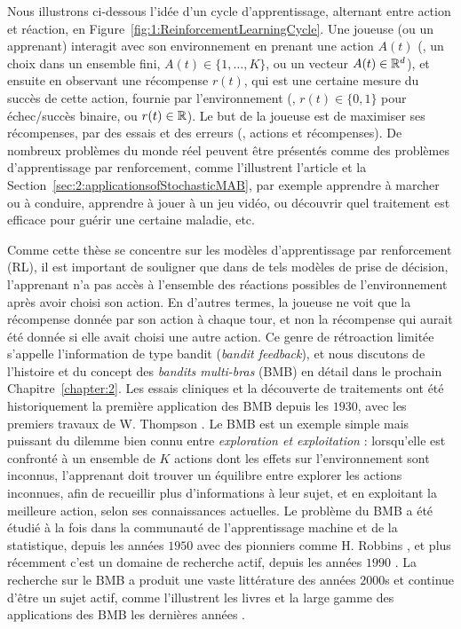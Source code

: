\begin{resume_fr}
Nous illustrons ci-dessous l'idée d'un cycle d'apprentissage, alternant entre action et réaction,
en Figure~\ref{fig:1:ReinforcementLearningCycle}.
Une joueuse (ou un apprenant) interagit avec son environnement en prenant une action $A(t)$ (\eg, un choix dans un ensemble fini, $A(t)\in\{1,\dots,K\}$, ou un vecteur $A(t)\in\mathbb{R}^d$), et ensuite en observant une récompense $r(t)$, qui est une certaine mesure du succès de cette action, fournie par l'environnement (\eg, $r(t)\in\{0,1\}$ pour échec/succès binaire, ou $r(t)\in\mathbb{R}$).
Le but de la joueuse est de maximiser ses récompenses, par des essais et des erreurs (\ie, actions et récompenses).
De nombreux problèmes du monde réel peuvent être présentés comme des problèmes d'apprentissage par renforcement, comme l'illustrent l'article \cite{bouneffouf2019survey} et la Section~\ref{sec:2:applicationsofStochasticMAB}, par exemple apprendre à marcher ou à conduire, apprendre à jouer à un jeu vidéo, ou découvrir quel traitement est efficace pour guérir une certaine maladie, etc.


Comme cette thèse se concentre sur les modèles d'apprentissage par renforcement (RL),
il est important de souligner que dans de tels modèles de prise de décision, l'apprenant n'a pas accès à l'ensemble des réactions possibles de l'environnement après avoir choisi son action.
%
En d'autres termes, la joueuse ne voit que la récompense donnée par son action à chaque tour, et non la récompense qui aurait été donnée si elle avait choisi une autre action.
Ce genre de rétroaction limitée s'appelle l'information de type bandit (\emph{bandit feedback}), et nous discutons de l'histoire et du concept des \emph{bandits multi-bras} (BMB) en détail dans le prochain Chapitre~\ref{chapter:2}.
Les essais cliniques et la découverte de traitements ont été historiquement la première application des BMB depuis les $1930$, avec les premiers travaux de W. Thompson \cite{Thompson33}.
%
Le BMB est un exemple simple mais puissant du dilemme bien connu entre \emph{exploration et exploitation} :
lorsqu'elle est confronté à un ensemble de $K$ actions dont les effets sur l'environnement sont inconnus, l'apprenant doit trouver un équilibre entre
explorer les actions inconnues, afin de recueillir plus d'informations à leur sujet,
et en exploitant la meilleure action, selon ses connaissances actuelles.
%
Le problème du BMB a été étudié à la fois dans la communauté de l'apprentissage machine et de la statistique, depuis les années $1950$ avec des pionniers comme H. Robbins \cite{Robbins52}, et plus récemment c'est un domaine de recherche actif, depuis les années $1990$ \cite{Anantharam87a,Anantharam87b,auer1995gambling,Agrawal95}.
La recherche sur le BMB a produit une vaste littérature des années $2000$s \cite{Auer02,Auer02NonStochastic,Audibert2009minimax} et continue d'être un sujet actif, comme l'illustrent les livres \cite{Bubeck12,LattimoreBanditAlgorithmsBook,Slivkins2019} et la large gamme des applications des BMB les dernières années \cite{bouneffouf2019survey}.



\end{resume_fr}
